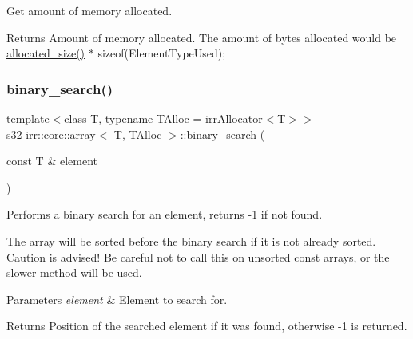 Get amount of memory allocated. 

\begin{DoxyReturn}{Returns}
Amount of memory allocated. The amount of bytes allocated would be \hyperlink{classirr_1_1core_1_1array_a21e5b20b7a56ba174b19b6c36c78a14b}{allocated\+\_\+size()} $\ast$ sizeof(\+Element\+Type\+Used); 
\end{DoxyReturn}
\mbox{\label{classirr_1_1core_1_1array_a35412f669b983eaaf3792b82966db24a}} 
\subsubsection{\texorpdfstring{binary\+\_\+search()}{binary\_search()}\hspace{0.1cm}{\footnotesize\ttfamily [1/6]}}
{\footnotesize\ttfamily template$<$class T, typename T\+Alloc = irr\+Allocator$<$\+T$>$$>$ \\
\hyperlink{namespaceirr_ac66849b7a6ed16e30ebede579f9b47c6}{s32} \hyperlink{classirr_1_1core_1_1array}{irr\+::core\+::array}$<$ T, T\+Alloc $>$\+::binary\+\_\+search (\begin{DoxyParamCaption}\item[{const T \&}]{element }\end{DoxyParamCaption})\hspace{0.3cm}{\ttfamily [inline]}}



Performs a binary search for an element, returns -\/1 if not found. 

The array will be sorted before the binary search if it is not already sorted. Caution is advised! Be careful not to call this on unsorted const arrays, or the slower method will be used. 
\begin{DoxyParams}{Parameters}
{\em element} & Element to search for. \\
\hline
\end{DoxyParams}
\begin{DoxyReturn}{Returns}
Position of the searched element if it was found, otherwise -\/1 is returned. 
\end{DoxyReturn}
\mbox{\label{classirr_1_1core_1_1array_a35412f669b983eaaf3792b82966db24a}} 
